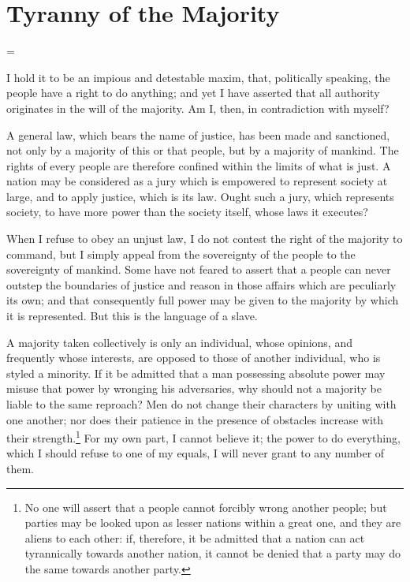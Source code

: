 
\author{Alexis de Tocqueville}
\chapter{Tyranny of the Majority}


\hangindent=\parindent
{}

\vspace{1\baselineskip}

\noindent I hold it to be an impious and detestable maxim, that,
politically speaking, the people have a right to do anything; and yet
I have asserted that all authority originates in the will of the
majority. Am I, then, in contradiction with myself?

A general law, which bears the name of justice, has been made and
sanctioned, not only by a majority of this or that people, but by a
majority of mankind. The rights of every people are therefore confined
within the limits of what is just. A nation may be considered as a
jury which is empowered to represent society at large, and to apply
justice, which is its law. Ought such a jury, which represents
society, to have more power than the society itself, whose laws it
executes?

When I refuse to obey an unjust law, I do not contest the right of the
majority to command, but I simply appeal from the sovereignty of the
people to the sovereignty of mankind. Some have not feared to assert
that a people can never outstep the boundaries of justice and reason
in those affairs which are peculiarly its own; and that consequently
full power may be given to the majority by which it is represented.
But this is the language of a slave.

A majority taken collectively is only an individual, whose opinions,
and frequently whose interests, are opposed to those of another
individual, who is styled a minority. If it be admitted that a man
possessing absolute power may misuse that power by wronging his
adversaries, why should not a majority be liable to the same
 reproach? Men do not change their characters by uniting
with one another; nor does their patience in the presence of obstacles
increase with their strength.\footnote{No one will assert that a
people cannot forcibly wrong another people; but parties may be looked
upon as lesser nations within a great one, and they are aliens to each
other: if, therefore, it be admitted that a nation can act
tyrannically towards another nation, it cannot be denied that a party
may do the same towards another party.} For my own part, I cannot
believe it; the power to do everything, which I should refuse to one
of my equals, I will never grant to any number of them.

